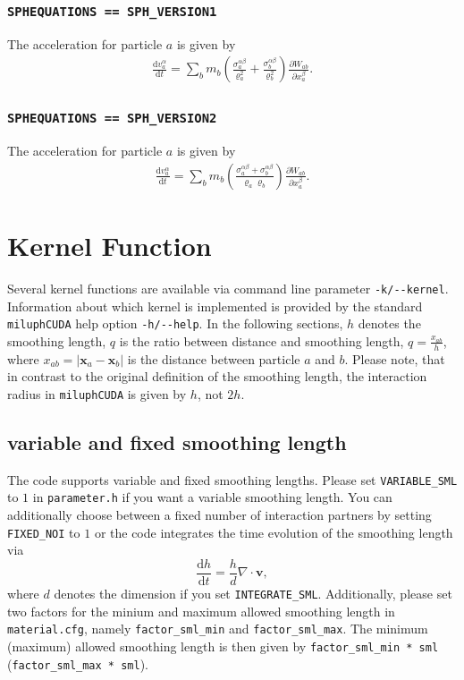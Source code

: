 \documentclass[10pt,fleqn,twoside]{article}
\renewcommand{\vec}[1]{{\mathbf #1}}
\begin{document}
\subsubsection{\texttt{SPHEQUATIONS == SPH\_VERSION1}}
The acceleration for particle $a$ is given by
\begin{align}
 \frac{\mathrm{d} v^\alpha_a}{\mathrm{d} t} = \sum_b m_b \left( \frac{\sigma^{\alpha
   \beta}_a}{\varrho_a^2} + \frac{\sigma^{\alpha \beta}_b}{\varrho_b^2} \right ) \frac{\partial
  W_{ab}}{\partial x_a^\beta}.
\end{align}
\subsubsection{\texttt{SPHEQUATIONS == SPH\_VERSION2}}
The acceleration for particle $a$ is given by
\begin{align}
 \frac{\mathrm{d} v^\alpha_a}{\mathrm{d} t} = \sum_b m_b \left( \frac{\sigma^{\alpha
   \beta}_a + \sigma^{\alpha \beta}_b}{\varrho_a  \varrho_b} \right ) \frac{\partial
  W_{ab}}{\partial x_a^\beta}.
\end{align}

\section{Kernel Function}
Several kernel functions are available via command line parameter \texttt{-k/-{}-kernel}. Information about
which kernel is implemented is provided by the standard \texttt{miluphCUDA} help option \texttt{-h/-{}-help}.
In the following sections, $h$ denotes the smoothing length, $q$ is the ratio between distance and
smoothing length, $q=\frac{x_{ab}}{h}$, where $x_{ab}=\left|{\mathbf{x}_a -
 \mathbf{x}_b}\right|$ is the distance between particle $a$ and $b$. Please note, that in contrast to
the original definition of the smoothing length, the interaction radius in \texttt{miluphCUDA} is
given by $h$, not $2h$.

\subsection{variable and fixed smoothing length}
The code supports variable and fixed smoothing lengths. Please set \texttt{VARIABLE\_SML} to $1$ in \texttt{parameter.h}
if you want a variable smoothing length. You can additionally choose between a fixed number of interaction partners by setting
\texttt{FIXED\_NOI} to $1$ or the code integrates the time evolution of the smoothing length via
\begin{equation}
 \frac{\mathrm{d} h}{\mathrm{d}t} = \frac{h}{d} \nabla \cdot \vec{v},
\end{equation}
where $d$ denotes the dimension if you set \texttt{INTEGRATE\_SML}. Additionally, please set two factors for the minium and maximum allowed smoothing length
in \texttt{material.cfg}, namely \texttt{factor\_sml\_min} and \texttt{factor\_sml\_max}. The minimum  (maximum) allowed
smoothing length is then given by \texttt{factor\_sml\_min * sml} (\texttt{factor\_sml\_max * sml}).
\end{document}
